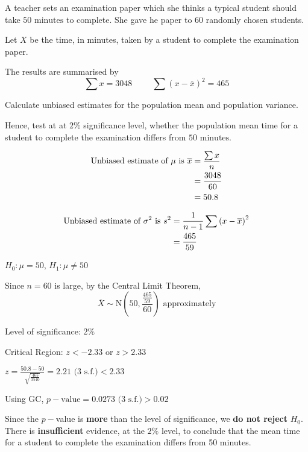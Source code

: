 \documentclass[11pt,a4paper]{book}
\begin{document}
\begin{example}

A teacher sets an examination paper which she thinks a typical student
should take $50\text{ minutes}$ to complete. She gave he paper to
$60$ randomly chosen students.

Let $X$ be the time, in minutes, taken by a student to complete the
examination paper.

The results are summarised by 
\[
\sum x=3048\hspace{1cm}\sum\left(x-\overline{x}\right)^{2}=465
\]

Calculate unbiased estimates for the population mean and population
variance.

Hence, test at at $2\%$ significance level, whether the population
mean time for a student to complete the examination differs from $50\text{ minutes}$.

\Solution

\begin{align*}
\text{Unbiased estimate of \ensuremath{\mu} is }\overline{x} & =\frac{\sum x}{n}\\
 & =\frac{3048}{60}\\
 & =50.8
\end{align*}

\begin{align*}
\text{Unbiased estimate of \ensuremath{\sigma^{2}} is }s^{2} & =\frac{1}{n-1}\sum\left(x-\overline{x}\right)^{2}\\
 & =\frac{465}{59}
\end{align*}

$H_{0}:\mu=50$, $H_{1}:\mu\neq50$

Since $n=60$ is large, by the Central Limit Theorem, 
\[
\overline{X}\sim\text{N}\left(50,\frac{\frac{465}{59}}{60}\right)\text{ approximately}
\]

Level of significance: $2\%$

Critical Region: $z<-2.33$ or $z>2.33$

${\displaystyle z=\frac{50.8-50}{\sqrt{\frac{465}{3540}}}}=2.21\text{ (3 s.f.)}<2.33$

Using GC, $p-\text{value}=0.0273\text{ (3 s.f.)}>0.02$

\begin{tcolorbox}[colback=white, colframe=black,boxrule=.4pt, sharpish corners]

Since the $p-$value is \textbf{more} than the level of significance,
we \textbf{do not reject} $H_{0}$. There is \textbf{insufficient}
evidence, at the $2\%$ level, to conclude that the mean time for
a student to complete the examination differs from 50 minutes.
\end{tcolorbox}

\end{example}
\end{document}
